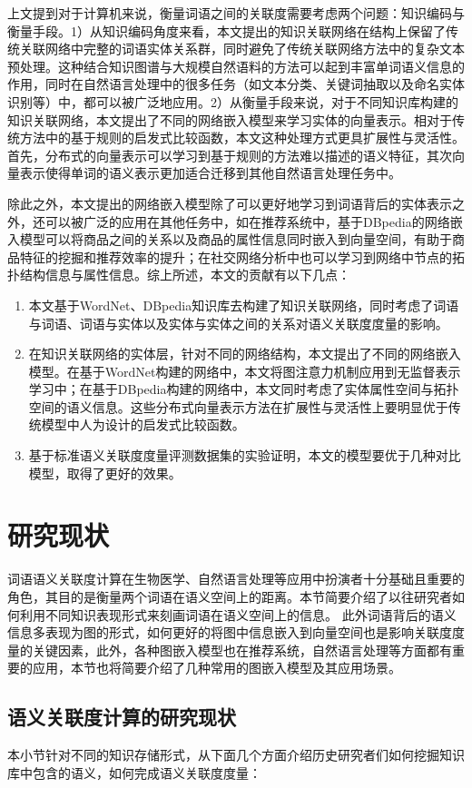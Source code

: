 上文提到对于计算机来说，衡量词语之间的关联度需要考虑两个问题：知识编码与衡量手段。1）从知识编码角度来看，本文提出的知识关联网络在结构上保留了传统关联网络中完整的词语实体关系群，同时避免了传统关联网络方法中的复杂文本预处理。这种结合知识图谱与大规模自然语料的方法可以起到丰富单词语义信息的作用，同时在自然语言处理中的很多任务（如文本分类、关键词抽取以及命名实体识别等）中，都可以被广泛地应用。2）从衡量手段来说，对于不同知识库构建的知识关联网络，本文提出了不同的网络嵌入模型来学习实体的向量表示。相对于传统方法中的基于规则的启发式比较函数，本文这种处理方式更具扩展性与灵活性。首先，分布式的向量表示可以学习到基于规则的方法难以描述的语义特征，其次向量表示使得单词的语义表示更加适合迁移到其他自然语言处理任务中。

除此之外，本文提出的网络嵌入模型除了可以更好地学习到词语背后的实体表示之外，还可以被广泛的应用在其他任务中，如在推荐系统中，基于DBpedia的网络嵌入模型可以将商品之间的关系以及商品的属性信息同时嵌入到向量空间，有助于商品特征的挖掘和推荐效率的提升；在社交网络分析中也可以学习到网络中节点的拓扑结构信息与属性信息。综上所述，本文的贡献有以下几点：
\begin{enumerate}[（1）]
    \item 本文基于WordNet、DBpedia知识库去构建了知识关联网络，同时考虑了词语与词语、词语与实体以及实体与实体之间的关系对语义关联度度量的影响。
    \item 在知识关联网络的实体层，针对不同的网络结构，本文提出了不同的网络嵌入模型。在基于WordNet构建的网络中，本文将图注意力机制应用到无监督表示学习中；在基于DBpedia构建的网络中，本文同时考虑了实体属性空间与拓扑空间的语义信息。这些分布式向量表示方法在扩展性与灵活性上要明显优于传统模型中人为设计的启发式比较函数。
    \item 基于标准语义关联度度量评测数据集的实验证明，本文的模型要优于几种对比模型，取得了更好的效果。
\end{enumerate}

\section{研究现状}
词语语义关联度计算在生物医学、自然语言处理等应用中扮演者十分基础且重要的角色，其目的是衡量两个词语在语义空间上的距离。本节简要介绍了以往研究者如何利用不同知识表现形式来刻画词语在语义空间上的信息。
%
此外词语背后的语义信息多表现为图的形式，如何更好的将图中信息嵌入到向量空间也是影响关联度度量的关键因素，此外，各种图嵌入模型也在推荐系统，自然语言处理等方面都有重要的应用，本节也将简要介绍了几种常用的图嵌入模型及其应用场景。

\subsection{语义关联度计算的研究现状}
本小节针对不同的知识存储形式，从下面几个方面介绍历史研究者们如何挖掘知识库中包含的语义，如何完成语义关联度度量：

